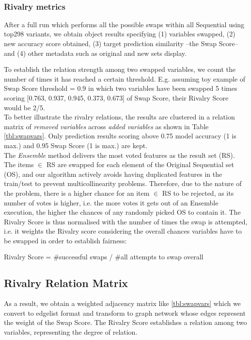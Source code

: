\\

\subsubsection{Rivalry metrics}


After a full run which performs all the possible swaps within all Sequential using top298 variants, we obtain object results specifying (1) variables swapped, (2) new accuracy score obtained, (3) target prediction similarity --the Swap Score-- and (4) other metadata such as original and new sets display.

To establish the relation strength among two swapped variables, we count the number of times it has reached a certain threshold. E.g. assuming toy example of Swap Score threshold = 0.9 in which two variables have been swapped 5 times scoring [0.763, 0.937, 0.945, 0.373, 0.673] of Swap Score, their Rivalry Score would be 2/5.
\\

To better illustrate the rivalry relations, the results are clustered in a relation matrix of \textit{removed variables} across \textit{added variables} as shown in Table \ref{tbl:swapvars}. Only prediction results scoring above 0.75 model accuracy (1 is max.) and 0.95 Swap Score (1 is max.) are kept.
\\

The \emph{Ensemble} method delivers the most voted features as the result set (RS). The items  $\in$  RS are swapped for each element of the Original Sequential set (OS), and our algorithm actively avoids having duplicated features in the train/test to prevent multicollinearity problems. Therefore, due to the nature of the problem, there is a higher chance for an item  $\in$  RS to be rejected, as its number of votes is higher, i.e. the more votes it gets out of an Ensemble execution, the higher the chances of any randomly picked OS to contain it. The Rivalry Score is thus normalised with the number of times the swap is attempted, i.e. it weights the Rivalry score considering the overall chances variables have to be swapped in order to establish fairness:

\begin{center}
    Rivalry Score = \#successful swaps / \#all attempts to swap overall
\end{center}


\subsection{Rivalry Relation Matrix}
As a result, we obtain a weighted adjacency matrix like \ref{tbl:swapvars} which we convert to edgelist format and transform to graph network whose edges represent the weight of the Swap Score. The Rivalry Score establishes a relation among two variables, representing the degree of relation.
\\

